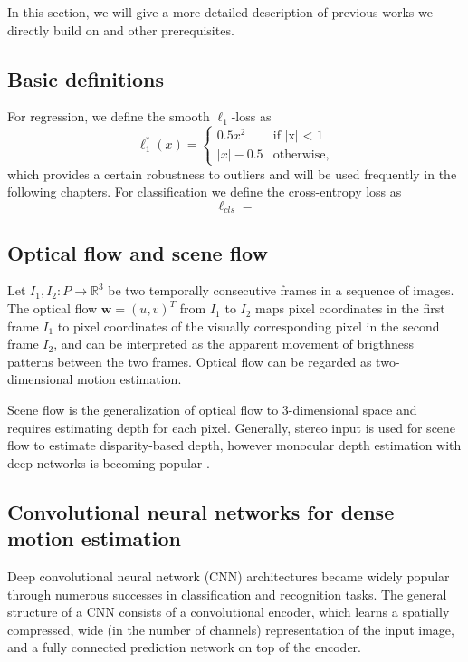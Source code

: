In this section, we will give a more detailed description of previous works
we directly build on and other prerequisites.

\subsection{Basic definitions}
For regression, we define the smooth $\ell_1$-loss as
\begin{equation}
\ell_1^*(x) =
\begin{cases}
0.5x^2 &\text{if |x| < 1} \\
|x| - 0.5 &\text{otherwise,}
\end{cases}
\end{equation}
which provides a certain robustness to outliers and will be used
frequently in the following chapters.
For classification we define the cross-entropy loss as
\begin{equation}
\ell_{cls} =
\end{equation}

\subsection{Optical flow and scene flow}
Let $I_1,I_2 : P \to \mathbb{R}^3$ be two temporally consecutive frames in a
sequence of images.
The optical flow
$\mathbf{w} = (u, v)^T$ from $I_1$ to $I_2$
maps pixel coordinates in the first frame $I_1$ to pixel coordinates of the
visually corresponding pixel in the second frame $I_2$,
and can be interpreted as the apparent movement of brigthness patterns between the two frames.
Optical flow can be regarded as two-dimensional motion estimation.

Scene flow is the generalization of optical flow to 3-dimensional space and
requires estimating depth for each pixel. Generally, stereo input is used for scene flow
to estimate disparity-based depth, however monocular depth estimation with deep networks is becoming
popular \cite{DeeperDepth}.

\subsection{Convolutional neural networks for dense motion estimation}
Deep convolutional neural network (CNN) architectures
\cite{ImageNetCNN, VGGNet, ResNet}
became widely popular through numerous successes in classification and recognition tasks.
The general structure of a CNN consists of a convolutional encoder, which
learns a spatially compressed, wide (in the number of channels) representation of the input image,
and a fully connected prediction network on top of the encoder.

